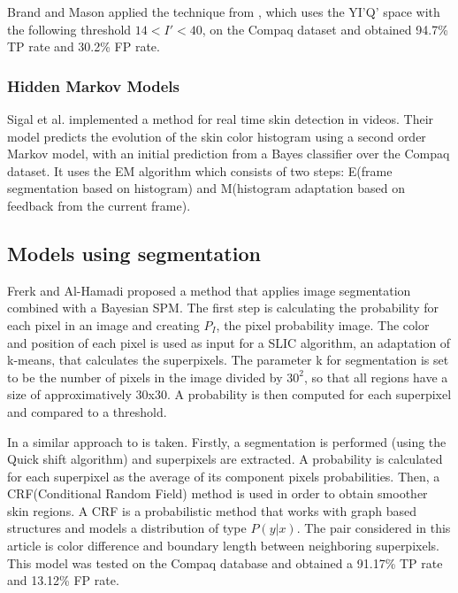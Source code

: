 \documentclass[12pt]{report}
\begin{document}
 	Brand and Mason \cite{i_threshold_applied} applied the technique from \cite{i_threshold}, which uses the YI'Q' space with the following threshold \(14 < I' < 40\), on the Compaq dataset and obtained 94.7\% TP rate and 30.2\% FP rate.
 	
 	\subsubsection{Hidden Markov Models}
 	Sigal et al.\cite{hmm} implemented a method for real time skin detection in videos. Their model predicts the evolution of the skin color histogram using a second order Markov model, with an initial prediction from a Bayes classifier over the Compaq dataset. It uses the EM algorithm which consists of two steps: E(frame segmentation based on histogram) and M(histogram adaptation based on feedback from the current frame).
 	
 	\subsection{Models using segmentation}
 	Frerk and Al-Hamadi\cite{superpixels_applied_1} proposed a method that applies image segmentation combined with a Bayesian SPM. The first step is calculating the probability for each pixel in an image and creating \(P_I\), the pixel probability image. The color and position of each pixel is used as input for a SLIC algorithm, an adaptation of k-means, that calculates the superpixels. The parameter k for segmentation is set to be the number of pixels in the image divided by \(30^2\), so that all regions have a size of approximatively 30x30. A probability is then computed for each superpixel and compared to a threshold.
 	
 	In \cite{superpixels_applied_2} a similar approach to \cite{superpixels_applied_1} is taken. Firstly, a segmentation is performed (using the Quick shift algorithm) and superpixels are extracted. A probability is calculated for each superpixel as the average of its component pixels probabilities. Then, a CRF(Conditional Random Field) method is used in order to obtain smoother skin regions. A CRF is a probabilistic method that works with graph based structures and models a distribution of type $P(y|x)$. The pair considered in this article is color difference and boundary length between neighboring superpixels. This model was tested on the Compaq database and obtained a 91.17\% TP rate and 13.12\% FP rate.
 	
\end{document}
